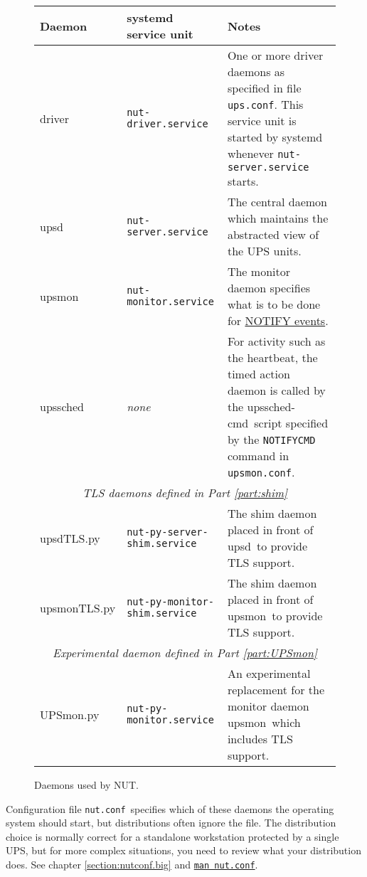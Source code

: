 \documentclass[12pt]{article}
\newcommand{\upsd}{\mbox{\textcolor{UPSDCOLOUR}{upsd}}}
\newcommand{\driver}{\mbox{\textcolor{UPSDCOLOUR}{driver}}}
\newcommand{\upsmon}{\mbox{\textcolor{MONCOLOUR}{upsmon}}}
\newcommand{\upssched}{\mbox{\textcolor{SCHEDCOLOUR}{upssched}}}
\newcommand{\upsschedcmd}{\mbox{\textcolor{CMDCOLOUR}{upssched-cmd}}}
\newcommand{\upsdTLS}{\mbox{\textcolor{UPSDCOLOUR}{upsdTLS.py}}}
\newcommand{\upsmonTLS}{\mbox{\textcolor{UPSMONCOLOUR}{upsmonTLS.py}}}
\newcommand{\UPSmon}{\mbox{\textcolor{UPSMONCOLOUR}{UPSmon.py}}}
\newcommand{\nutconf}{\textcolor{NUTCOLOUR}{\texttt{nut.conf}}}
\newcommand{\upsconf}{\textcolor{UPSDCOLOUR}{\texttt{ups.conf}}}
\newcommand{\upsmonconf}{\textcolor{MONCOLOUR}{\texttt{upsmon.conf}}}
\newcommand{\NUTman}[1]{\href{http://networkupstools.org/docs/man/#1.html}{\texttt{man #1}}}
\newcommand{\Ref}[1]{\ref{#1}}
\begin{document}
\begin{figure}[ht]
\begin{center}
\begin{tabular}{|l|l|p{0.6\LinePrinterwidth}|}
\hline
\textbf{Daemon} & \textbf{systemd service unit} 
            & \textbf{Notes} \\ \hline\hline
\driver     & \texttt{nut-driver.service}
            & One or more driver daemons as specified in file \upsconf.
              This service unit is started by systemd whenever
              \texttt{nut-server.service} starts. \\ \hline
\upsd       & \texttt{nut-server.service}
            & The central daemon which maintains the abstracted view 
              of the UPS units. \\ \hline
\upsmon     & \texttt{nut-monitor.service}
            & The monitor daemon specifies what is to be done for 
              \hyperref[fig:NOTIFYevents]{NOTIFY events}. \\ \hline
\upssched   & \textit{none}
            & For activity such as the heartbeat, the timed action daemon 
              is called by the \upsschedcmd\ script specified 
              by the \texttt{NOTIFYCMD} command in \upsmonconf.  \\ \hline\hline
\multicolumn{3}{|c|}{\textit{TLS daemons defined in Part \ref{part:shim}}} \\ \hline
\upsdTLS    & \texttt{nut-py-server-shim.service}
            & The shim daemon placed in front of \upsd\ to provide TLS support. \\ \hline
\upsmonTLS  & \texttt{nut-py-monitor-shim.service}
            & The shim daemon placed in front of \upsmon\ to provide TLS support. \\ \hline\hline
\multicolumn{3}{|c|}{\textit{Experimental daemon defined in Part \ref{part:UPSmon}}} \\ \hline
\UPSmon     & \texttt{nut-py-monitor.service}
            & An experimental replacement for the monitor daemon \upsmon\ which
              includes TLS support. \\ \hline
\end{tabular}
\caption{Daemons used by NUT.\label{fig:daemons}}
\end{center}
\end{figure}

Configuration file \nutconf\ specifies which of these daemons the operating
system should start, but distributions often ignore the file.  The
distribution choice is normally correct for a standalone workstation protected
by a single UPS, but for more complex situations, you need to review what your
distribution does.  See chapter \Ref{section:nutconf.big} and \NUTman{nut.conf}.
\end{document}
